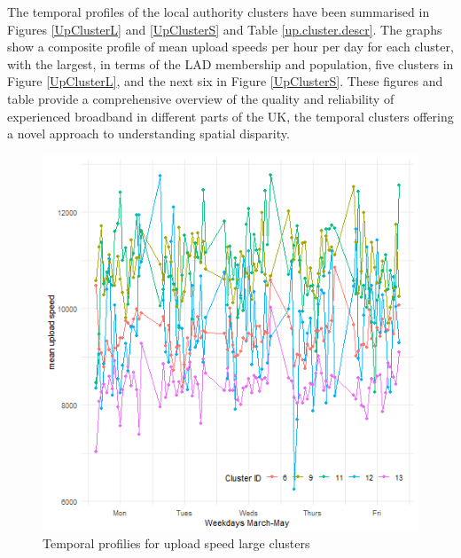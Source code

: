 \documentclass[,]{sagej}
\begin{document}
The temporal profiles of the local authority clusters have been
summarised in Figures \ref{UpClusterL} and \ref{UpClusterS} and Table
\ref{up.cluster.descr}. The graphs show a composite profile of mean
upload speeds per hour per day for each cluster, with the largest, in
terms of the LAD membership and population, five clusters in Figure
\ref{UpClusterL}, and the next six in Figure \ref{UpClusterS}. These
figures and table provide a comprehensive overview of the quality and
reliability of experienced broadband in different parts of the UK, the
temporal clusters offering a novel approach to understanding spatial
disparity.

\begin{figure}
\includegraphics[width=0.95\linewidth]{figures/upClusterL} \caption{\label{UpClusterL}Temporal profilies for upload speed large clusters}\label{fig:unnamed-chunk-2}
\end{figure}
\end{document}
